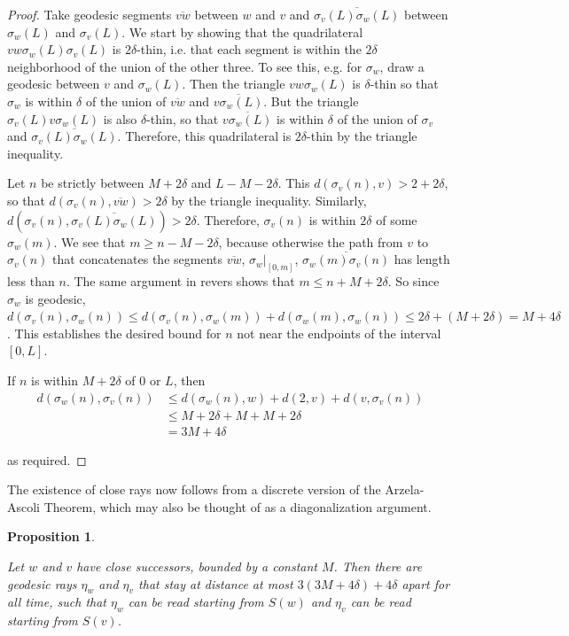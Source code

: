 \documentclass{amsart}
\newtheorem{proposition}[theorem]{Proposition}
\theoremstyle{definition}
\theoremstyle{remark}
\begin{document}
	\begin{proof}
		
		Take geodesic segments $\overline{vw}$ between $w$ and $v$ and $\overline{\sigma_v(L)\sigma_w(L)}$ between $\sigma_w(L)$ and $\sigma_v(L)$. We start by showing that the quadrilateral $v w \sigma_w(L)\sigma_v(L)$ is $2\delta$-thin, i.e. that each segment is within the $2\delta$ neighborhood of the union of the other three. To see this, e.g. for $\sigma_w$, draw a geodesic between $v$ and $\sigma_w(L)$. Then the triangle $v w \sigma_w(L)$ is $\delta$-thin so that $\sigma_w$ is within $\delta$ of the union of $\overline{vw}$ and $\overline{v\sigma_w(L)}$. But the triangle $\sigma_v(L) v \sigma_w(L)$ is also $\delta$-thin, so that $\overline{v\sigma_w(L)}$ is within $\delta$ of the union of $\sigma_v$ and $\overline{\sigma_v(L)\sigma_w(L)}$. Therefore, this quadrilateral is $2\delta$-thin by the triangle inequality.
		
		Let $n$ be strictly between $M+2\delta$ and $L-M-2\delta$.	This $d(\sigma_v(n), v)>2+2\delta$, so that $d(\sigma_v(n), \overline{vw})>2\delta$ by the triangle inequality. Similarly, $d(\sigma_v(n),\overline{\sigma_v(L)\sigma_w(L)})>2\delta$. Therefore, $\sigma_v(n)$ is within $2\delta$ of some $\sigma_w(m)$. We see that $m\ge n-M-2\delta$, because otherwise the path from $v$ to $\sigma_v(n)$ that concatenates the segments $\overline{vw}$, $\sigma_w|_{[0,m]}$, $\overline{\sigma_w(m)\sigma_v(n)}$ has length less than $n$. The same argument in revers shows that $m\le n+M+2\delta$. So since $\sigma_w$ is geodesic, $d(\sigma_v(n),\sigma_w(n))\le d(\sigma_v(n),\sigma_w(m))+d(\sigma_w(m),\sigma_w(n))\le 2\delta+(M+2\delta)=M+4\delta$. This establishes the desired bound for $n$ not near the endpoints of the interval $[0,L]$.
		
		If $n$ is within $M+2\delta$ of $0$ or $L$, then \begin{align*}
		d(\sigma_w(n),\sigma_v(n))&\le d(\sigma_w(n),w)+d(2,v)+d(v,\sigma_v(n))\\
		&\le M+2\delta+M+M+2\delta\\
		&=3M+4\delta
		\end{align*}
		
		as required.
	\end{proof}
	
	The existence of close rays now follows from a discrete version of the Arzela-Ascoli Theorem, which may also be thought of as a diagonalization argument.
	
	\begin{proposition} \label{CloseSuccessorRays}
		
		Let $w$ and $v$ have close successors, bounded by a constant $M$. Then there are geodesic rays $\eta_w$ and $\eta_v$ that stay at distance at most $3(3M+4\delta)+4\delta$ apart for all time, such that $\eta_w$ can be read starting from $S(w)$ and $\eta_v$ can be read starting from $S(v)$. 
		
	\end{proposition}
	
\end{document}
